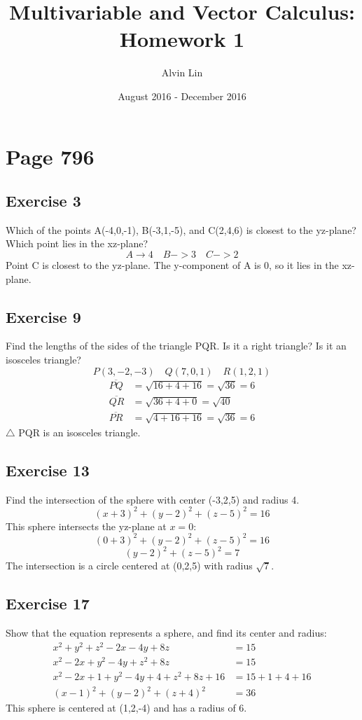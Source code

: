 \documentclass[letterpaper, 12pt]{math}
\title{Multivariable and Vector Calculus: Homework 1}
\author{Alvin Lin}
\date{August 2016 - December 2016}
\begin{document}
\maketitle

\section*{Page 796}

\subsection*{Exercise 3}
Which of the points A(-4,0,-1), B(-3,1,-5), and C(2,4,6) is closest to the
yz-plane? Which point lies in the xz-plane?
\[ A \to 4 \quad B -> 3 \quad C -> 2 \]
Point C is closest to the yz-plane. The y-component of A is 0, so it lies in the
xz-plane.

\subsection*{Exercise 9}
Find the lengths of the sides of the triangle PQR. Is it a right triangle?
Is it an isosceles triangle?
\[ P(3,-2,-3) \quad Q(7,0,1) \quad R(1,2,1) \]
\begin{align*}
  \overline{PQ} &= \sqrt{16+4+16} = \sqrt{36} = 6 \\
  \overline{QR} &= \sqrt{36+4+0} = \sqrt{40} \\
  \overline{PR} &= \sqrt{4+16+16} = \sqrt{36} = 6
\end{align*}
\( \triangle \) PQR is an isosceles triangle.

\subsection*{Exercise 13}
Find the intersection of the sphere with center (-3,2,5) and radius 4.
\[ (x+3)^2+(y-2)^2+(z-5)^2 = 16 \]
This sphere intersects the yz-plane at \( x = 0 \):
\[ (0+3)^2+(y-2)^2+(z-5)^2 = 16 \]
\[ (y-2)^2+(z-5)^2 = 7 \]
The intersection is a circle centered at (0,2,5) with radius \( \sqrt{7} \).

\subsection*{Exercise 17}
Show that the equation represents a sphere, and find its center and radius:
\begin{align*}
  x^2+y^2+z^2-2x-4y+8z &= 15 \\
  x^2-2x+y^2-4y+z^2+8z &= 15 \\
  x^2-2x+1+y^2-4y+4+z^2+8z+16 &= 15+1+4+16 \\
  (x-1)^2+(y-2)^2+(z+4)^2 &= 36
\end{align*}
This sphere is centered at (1,2,-4) and has a radius of 6.
\end{document}
